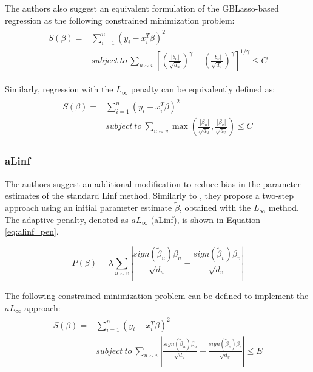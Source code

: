 The authors also suggest an equivalent formulation of the GBLasso-based regression as the following constrained minimization problem:
\begin{align} \label{eq:gblasso_constrained}
\begin{split}
S(\beta) = &\sum_{i=1}^{n} (y_i - x_i^T\beta)^2 \\ 
&subject\ to\ \sum_{u \sim v}
\left[\left(\frac{|b_u|}{\sqrt{d_u}}\right)^\gamma+
\left(\frac{|b_v|}{\sqrt{d_v}}\right)^\gamma\right]^{1/\gamma}\leq C
\end{split}
\end{align}

Similarly, regression with the $L_\infty$ penalty can be equivalently defined as:
\begin{align} \label{eq:linf_constrained}
\begin{split}
S(\beta) = &\sum_{i=1}^{n} (y_i - x_i^T\beta)^2 \\ 
&subject\ to\ \sum_{u \sim v}\max\left(\frac{|\beta_u|}{\sqrt{d_u}},\frac{|\beta_v|}{\sqrt{d_v}}\right)\leq C
\end{split}
\end{align}

\subsubsection{aLinf} \label{sec:alinf}
The authors suggest an additional modification to reduce bias in the parameter estimates of the standard Linf method. Similarly to \cite{li2010variable}, they propose a two-step approach using an initial parameter estimate $\tilde{\beta}$, obtained with the $L_\infty$ method. The adaptive penalty, denoted as $aL_\infty$ (aLinf), is shown in Equation \ref{eq:alinf_pen}.

\begin{equation} \label{eq:alinf_pen}
P(\beta) = \lambda\sum_{u \sim v}\left|\frac{sign(\tilde{\beta}_u)\beta_u}{\sqrt{d_u}}-\frac{sign(\tilde{\beta}_v)\beta_v}{\sqrt{d_v}}\right|
\end{equation}

The following constrained minimization problem can be defined to implement the $aL_\infty$ approach:
\begin{align} \label{eq:alinf_constrained}
\begin{split}
S(\beta) = &\sum_{i=1}^{n} (y_i - x_i^T\beta)^2 \\ 
&subject\ to\ \sum_{u \sim v}\left|\frac{sign(\tilde{\beta}_u)\beta_u}{\sqrt{d_u}}-\frac{sign(\tilde{\beta}_v)\beta_v}{\sqrt{d_v}}\right|\leq E
\end{split}
\end{align}


